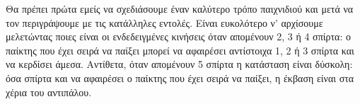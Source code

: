 \documentclass[a4paper,11pt,oneside]{book}
\begin{document}
Θα πρέπει πρώτα εμείς να σχεδιάσουμε έναν καλύτερο τρόπο παιχνιδιού και μετά να τον περιγράψουμε με τις κατάλληλες εντολές.
%
Είναι ευκολότερο ν' αρχίσουμε μελετώντας ποιες είναι οι ενδεδειγμένες κινήσεις όταν απομένουν 2, 3 ή 4 σπίρτα: ο παίκτης που έχει σειρά να παίξει μπορεί να αφαιρέσει αντίστοιχα 1, 2 ή 3 σπίρτα και να κερδίσει άμεσα. Αντίθετα, όταν απομένουν 5 σπίρτα η κατάσταση είναι δύσκολη: όσα σπίρτα και να αφαιρέσει ο παίκτης που έχει σειρά να παίξει, η έκβαση είναι στα χέρια του αντιπάλου. 
\end{document}
